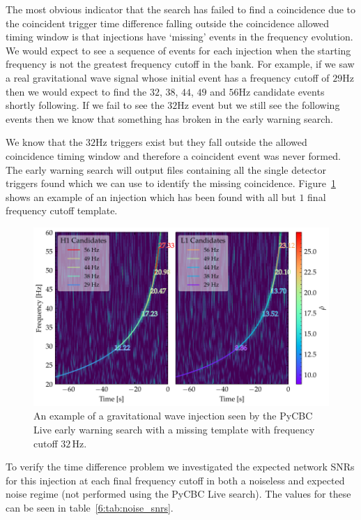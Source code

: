 The most obvious indicator that the search has failed to find a coincidence due to the coincident trigger time difference falling outside the coincidence allowed timing window is that injections have `missing' events in the frequency evolution. We would expect to see a sequence of events for each injection when the starting frequency is not the greatest frequency cutoff in the bank. For example, if we saw a real gravitational wave signal whose initial event has a frequency cutoff of $29$Hz then we would expect to find the $32$, $38$, $44$, $49$ and $56$Hz candidate events shortly following. If we fail to see the $32$Hz event but we still see the following events then we know that something has broken in the early warning search.

We know that the $32$Hz triggers exist but they fall outside the allowed coincidence timing window and therefore a coincident event was never formed. The early warning search will output files containing all the single detector triggers found which we can use to identify the missing coincidence. Figure~\ref{6:fig:missing-freq-eg} shows an example of an injection which has been found with all but $1$ final frequency cutoff template. 
%
\begin{figure}
    \centering
    \includegraphics[width=1.0\linewidth]{images/6_earlywarning/stories/missing_freqs_example.pdf}
    \caption{An example of a gravitational wave injection seen by the PyCBC Live early warning search with a missing template with frequency cutoff $32 \, \text{Hz}$.}
    \label{6:fig:missing-freq-eg}
\end{figure}
%
To verify the time difference problem we investigated the expected network SNRs for this injection at each final frequency cutoff in both a noiseless and expected noise regime (not performed using the PyCBC Live search). The values for these can be seen in table~\ref{6:tab:noise_snrs}.
